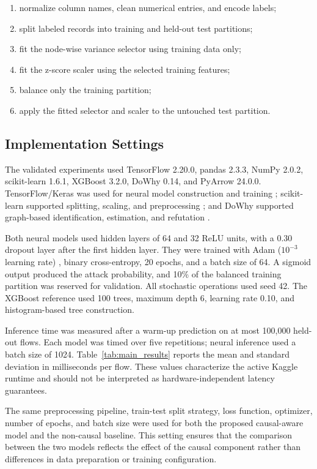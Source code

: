 \documentclass[journal]{IEEEtran}
\begin{document}
\begin{enumerate}
  \item normalize column names, clean numerical entries, and encode labels;
  \item split labeled records into training and held-out test partitions;
  \item fit the node-wise variance selector using training data only;
  \item fit the z-score scaler using the selected training features;
  \item balance only the training partition;
  \item apply the fitted selector and scaler to the untouched test partition.
\end{enumerate}

\subsection{Implementation Settings}

The validated experiments used TensorFlow 2.20.0, pandas 2.3.3, NumPy
2.0.2, scikit-learn 1.6.1, XGBoost 3.2.0, DoWhy 0.14, and PyArrow 24.0.0.
TensorFlow/Keras was used for neural model construction and training
\cite{abadi2016tensorflow}; scikit-learn supported splitting, scaling, and
preprocessing \cite{pedregosa2011scikit}; and DoWhy supported graph-based
identification, estimation, and refutation \cite{sharma2020dowhy}.

Both neural models used hidden layers of 64 and 32 ReLU units, with a 0.30
dropout layer after the first hidden layer. They were trained with Adam
($10^{-3}$ learning rate) \cite{kingma2015adam}, binary cross-entropy, 20
epochs, and a batch size of 64. A sigmoid output produced the attack
probability, and 10\% of the balanced training partition was reserved for
validation. All stochastic operations used seed 42. The XGBoost reference
used 100 trees, maximum depth 6, learning rate 0.10, and histogram-based tree
construction.

Inference time was measured after a warm-up prediction on at most 100,000
held-out flows. Each model was timed over five repetitions; neural inference
used a batch size of 1024. Table~\ref{tab:main_results} reports the mean and
standard deviation in milliseconds per flow. These values characterize the
active Kaggle runtime and should not be interpreted as hardware-independent
latency guarantees.

The same preprocessing pipeline, train-test split strategy, loss function, optimizer, number of epochs, and batch size were used for both the proposed causal-aware model and the non-causal baseline. This setting ensures that the comparison between the two models reflects the effect of the causal component rather than differences in data preparation or training configuration.
\end{document}
